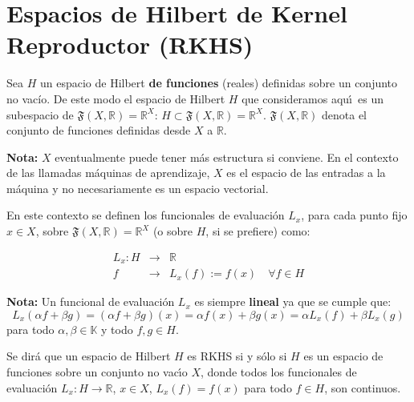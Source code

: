 \section{Espacios de Hilbert de Kernel Reproductor (RKHS)}

Sea $H$ un espacio de Hilbert {\bf de funciones} (reales) definidas
sobre un conjunto no vacío. De este modo el espacio de Hilbert $H$
que consideramos aqu\'\i\ es un subespacio de
$\mathfrak{F}(X,\mathbb{R})=\mathbb{R}^X$:
$H\subset\mathfrak{F}(X,\mathbb{R})=\mathbb{R}^X$.
$\mathfrak{F}(X,\mathbb{R})$ denota el conjunto de funciones definidas
desde $X$ a $\mathbb{R}$.

\textbf{Nota:} $X$ eventualmente puede tener m\'as estructura si
conviene. En el contexto de las llamadas máquinas de
aprendizaje, $X$ es el espacio de las entradas a la m\'aquina y no
necesariamente es un espacio vectorial.

\begin{mydef}
En este contexto se definen los funcionales de evaluaci\'on $L_x$,
para cada punto fijo $x\in X$, sobre
$\mathfrak{F}(X,\mathbb{R})=\mathbb{R}^X$
(o sobre $H$, si se prefiere) como:


\begin{eqnarray}
L_x: H &\rightarrow &\mathbb{R} \nonumber \\
 f &\rightarrow & L_x(f):= f(x) \quad\forall f\in H \label{eq:evalfu}
\end{eqnarray}

\end{mydef}



\noindent \textbf{Nota:} Un funcional de evaluación $L_x$ es siempre \textbf{lineal}
ya que se cumple que:
\begin{equation*}
L_x(\alpha f + \beta g)
= (\alpha f + \beta g)(x)
= \alpha f(x) + \beta g(x)
= \alpha L_x(f) + \beta L_x(g)
\end{equation*}
para todo $\alpha,\beta\in\mathbb{K}$ y todo $f,g\in H$.


\begin{mydef}
Se dir\'a que un espacio de Hilbert $H$ es RKHS si y s\'olo si
$H$ es un espacio de funciones sobre un conjunto no vac\'\i o $X$, donde
todos los funcionales de evaluaci\'on $L_x:H\to\mathbb{R}$, $x\in X$, 
$L_x(f)=f(x)$ para todo $f\in H$, son continuos.
\end{mydef}


